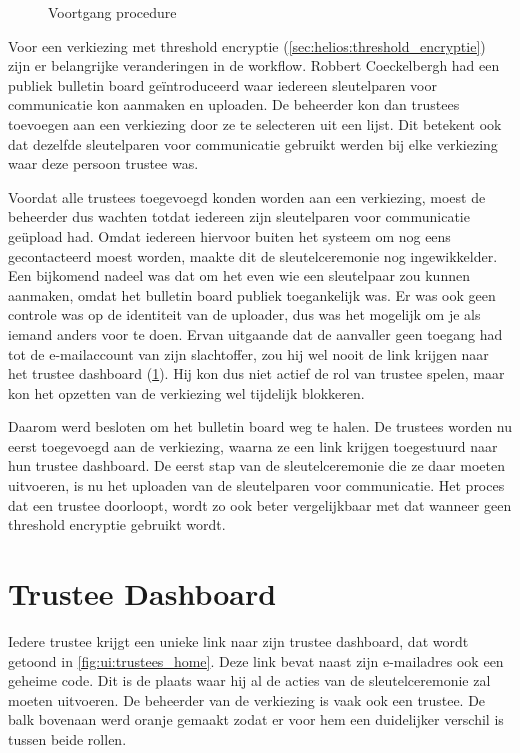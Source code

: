 \begin{figure}
  \caption{Voortgang procedure}
  \label{fig:ui:election_progress}
\end{figure}

\npar Voor een verkiezing met threshold encryptie (\ref{sec:helios:threshold_encryptie}) zijn er belangrijke veranderingen in de workflow. Robbert Coeckelbergh had een publiek bulletin board ge\"introduceerd waar iedereen sleutelparen voor communicatie kon aanmaken en uploaden. De beheerder kon dan trustees toevoegen aan een verkiezing door ze te selecteren uit een lijst. Dit betekent ook dat dezelfde sleutelparen voor communicatie gebruikt werden bij elke verkiezing waar deze persoon trustee was.

\npar Voordat alle trustees toegevoegd konden worden aan een verkiezing, moest de beheerder dus wachten totdat iedereen zijn sleutelparen voor communicatie ge\"upload had. Omdat iedereen hiervoor buiten het systeem om nog eens gecontacteerd moest worden, maakte dit de sleutelceremonie nog ingewikkelder. Een bijkomend nadeel was dat om het even wie een sleutelpaar zou kunnen aanmaken, omdat het bulletin board publiek toegankelijk was. Er was ook geen controle was op de identiteit van de uploader, dus was het mogelijk om je als iemand anders voor te doen. Ervan uitgaande dat de aanvaller geen toegang had tot de e-mailaccount van zijn slachtoffer, zou hij wel nooit de link krijgen naar het trustee dashboard (\ref{sec:ui:trustee_dashboard}). Hij kon dus niet actief de rol van trustee spelen, maar kon het opzetten van de verkiezing wel tijdelijk blokkeren.

\npar Daarom werd besloten om het bulletin board weg te halen. De trustees worden nu eerst toegevoegd aan de verkiezing, waarna ze een link krijgen toegestuurd naar hun trustee dashboard. De eerst stap van de sleutelceremonie die ze daar moeten uitvoeren, is nu het uploaden van de sleutelparen voor communicatie. Het proces dat een trustee doorloopt, wordt zo ook beter vergelijkbaar met dat wanneer geen threshold encryptie gebruikt wordt.

\section{Trustee Dashboard}
\label{sec:ui:trustee_dashboard}

Iedere trustee krijgt een unieke link naar zijn trustee dashboard, dat wordt getoond in \ref{fig:ui:trustees_home}. Deze link bevat naast zijn e-mailadres ook een geheime code. Dit is de plaats waar hij al de acties van de sleutelceremonie zal moeten uitvoeren. De beheerder van de verkiezing is vaak ook een trustee. De balk bovenaan werd oranje gemaakt zodat er voor hem een duidelijker verschil is tussen beide rollen.

